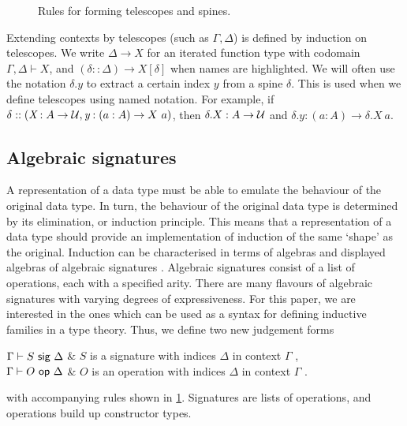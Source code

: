\begin{figure}[H]
  \vspace{-1em}
  \caption{Rules for forming telescopes and spines.}
  \label{fig:tel-rules}
  \vspace{-1em}
\end{figure}

Extending contexts by telescopes (such as $\Gamma, \Delta$) is defined by
induction on telescopes. We write $\Delta \to X$ for an iterated function type
with codomain $\Gamma, \Delta \vdash X$, and $(\delta :: \Delta) \to X[\delta]$
when names are highlighted. We will often use the notation $\delta.y$ to extract
a certain index $y$ from a spine $\delta$. This is used when we define
telescopes using named notation. For example, if $\delta :: (\textit{X} : A \to
\mathcal{U}, \textit{y} : (a : A) \to X\ a)$, then $\delta.X : A \to \mathcal{U}$ and
$\delta.y : (a : A) \to \delta.X\ a$.


\newcommand{\ValidCase}{\mta{ValidCase}}

\subsection{Algebraic signatures}

A representation of a data type must be able to emulate the behaviour of the
original data type. In turn, the behaviour of the original data type is
determined by its elimination, or induction principle. This means that a
representation of a data type should provide an implementation of induction of
the same `shape' as the original. Induction can be characterised in terms of
algebras and displayed algebras of algebraic signatures \cite{Adamek2010-ls,Kovacs2023-gq}.
Algebraic signatures consist of a list of operations, each with a specified
arity. There are many flavours of algebraic signatures with varying degrees of
expressiveness. For this paper, we are interested in the ones which can
be used as a syntax for defining inductive families in a type theory. Thus, we define
two new judgement forms
\begin{definitions}
$\Gamma \vdash S \ \textsf{sig}\  \Delta$    & $S$ is a signature with indices $\Delta$ in context $\Gamma$ , \\
$\Gamma \vdash O \ \textsf{op}\  \Delta$     & $O$ is an operation with indices $\Delta$ in context $\Gamma$ .
\end{definitions}
with accompanying rules shown in \cref{fig:tel-rules}.
Signatures are lists of operations, and operations build up constructor types.

